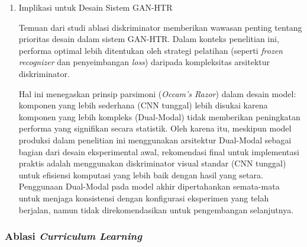 \begin{enumerate}[leftmargin=1.5em, labelsep=0.5em, itemindent=0pt, noitemsep, topsep=0pt]
          Hasil negatif pada pengujian hipotesis diskriminator \textit{dual-modal} memberikan implikasi teoretis bahwa penambahan kompleksitas model melalui integrasi fitur tekstual tidak selalu menjamin peningkatan kualitas restorasi. Temuan ini menggugurkan asumsi bahwa semakin kaya informasi yang diberikan kepada diskriminator (visual + tekstual), semakin baik performa \textit{generator}. Dalam kasus ini, informasi visual terbukti sudah memadai.


          Penelitian masa depan dapat mengeksplorasi strategi pelatihan alternatif seperti \textit{Teacher Forcing} atau \textit{Scheduled Sampling}; dalam pendekatan ini, diskriminator secara berkala diberikan akses ke teks \textit{ground truth} untuk mempelajari representasi tekstual yang lebih baik. Namun, pendekatan ini harus diterapkan dengan hati-hati untuk menghindari risiko dominasi berlebihan diskriminator yang dapat menyebabkan hilangnya gradien bagi generator jika diskriminator menjadi terlalu kuat dibandingkan generator.

    \item Implikasi untuk Desain Sistem GAN-HTR

          Temuan dari studi ablasi diskriminator memberikan wawasan penting tentang prioritas desain dalam sistem GAN-HTR. Dalam konteks penelitian ini, performa optimal lebih ditentukan oleh strategi pelatihan (seperti \textit{frozen recognizer} dan penyeimbangan \textit{loss}) daripada kompleksitas arsitektur diskriminator.

          Hal ini menegaskan prinsip parsimoni (\textit{Occam's Razor}) dalam desain model: komponen yang lebih sederhana (CNN tunggal) lebih disukai karena komponen yang lebih kompleks (Dual-Modal) tidak memberikan peningkatan performa yang signifikan secara statistik. Oleh karena itu, meskipun model produksi dalam penelitian ini menggunakan arsitektur Dual-Modal sebagai bagian dari desain eksperimental awal, rekomendasi final untuk implementasi praktis adalah menggunakan diskriminator visual standar (CNN tunggal) untuk efisiensi komputasi yang lebih baik dengan hasil yang setara. Penggunaan Dual-Modal pada model akhir dipertahankan semata-mata untuk menjaga konsistensi dengan konfigurasi eksperimen yang telah berjalan, namun tidak direkomendasikan untuk pengembangan selanjutnya.
\end{enumerate}

\subsubsection{Ablasi \textit{Curriculum Learning}}
\label{subsubsec:kontribusi-curriculum-learning}


